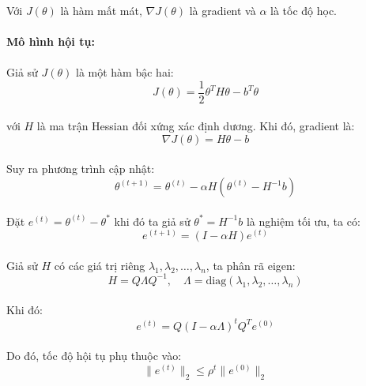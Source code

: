 \paragraph{}{Với \( J(\theta) \) là hàm mất mát, \( \nabla J(\theta) \) là gradient và \( \alpha \) là tốc độ học.}

\paragraph{}{\textbf{Mô hình hội tụ:} \cite{csstudyfun-convergence}} 

\paragraph{}{Giả sử \( J(\theta) \) là một hàm bậc hai:}
\[
J(\theta) = \frac{1}{2} \theta^T H \theta - b^T \theta
\]
\paragraph{}{với \( H \) là ma trận Hessian đối xứng xác định dương. Khi đó, gradient là:}
\[
\nabla J(\theta) = H \theta - b
\]
\paragraph{}{Suy ra phương trình cập nhật:}
\[
\theta^{(t+1)} = \theta^{(t)} - \alpha H (\theta^{(t)} - H^{-1} b)
\]
\paragraph{}{Đặt \( e^{(t)} = \theta^{(t)} - \theta^* \) khi đó ta giả sử  \( \theta^* = H^{-1} b \) là nghiệm tối ưu, ta có:}
\[
e^{(t+1)} = (I - \alpha H) e^{(t)}
\]
\paragraph{}{Giả sử \( H \) có các giá trị riêng \( \lambda_1, \lambda_2, \dots, \lambda_n \), ta phân rã eigen:}
\[
H = Q \Lambda Q^{-1}, \quad \Lambda = \text{diag}(\lambda_1, \lambda_2, \dots, \lambda_n)
\]
\paragraph{}{Khi đó:}
\[
e^{(t)} = Q (I - \alpha \Lambda)^t Q^T e^{(0)}
\]
\paragraph{}{Do đó, tốc độ hội tụ phụ thuộc vào:}
\[
\| e^{(t)} \|_2 \leq \rho^t \| e^{(0)} \|_2
\]
